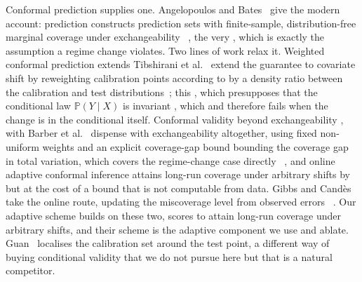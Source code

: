 \documentclass[preprint,3p,times]{elsarticle}
\providecommand{\DIFaddtex}[1]{{\protect\color{blue} \sf #1}} %
\providecommand{\DIFdeltex}[1]{{\protect\color{red} \scriptsize #1}} %
\providecommand{\DIFaddbegin}{} %
\providecommand{\DIFaddend}{} %
\providecommand{\DIFdelbegin}{} %
\providecommand{\DIFdelend}{} %
\providecommand{\DIFadd}[1]{\texorpdfstring{\DIFaddtex{#1}}{#1}} %
\providecommand{\DIFdel}[1]{\texorpdfstring{\DIFdeltex{#1}}{}} %
\begin{document}
\DIFadd{Conformal prediction supplies one. Angelopoulos and Bates~\cite{angelopoulos2023} give the modern account: }\DIFaddend prediction \DIFdelbegin \DIFdel{constructs prediction }\DIFdelend sets with finite-sample, distribution-free \DIFaddbegin \DIFadd{marginal }\DIFaddend coverage under exchangeability\DIFdelbegin \DIFdel{~\cite{angelopoulos2023}, the very }\DIFdelend \DIFaddbegin \DIFadd{, which is exactly the }\DIFaddend assumption a regime change violates. Two lines of work relax it. \DIFdelbegin \DIFdel{Weighted conformal prediction extends }\DIFdelend \DIFaddbegin \DIFadd{Tibshirani et al.~\cite{tibshirani2019} extend }\DIFaddend the guarantee to covariate shift by reweighting calibration points \DIFdelbegin \DIFdel{according to }\DIFdelend \DIFaddbegin \DIFadd{by }\DIFaddend a density ratio\DIFdelbegin \DIFdel{between the calibration and test distributions~\cite{tibshirani2019}; this }\DIFdelend \DIFaddbegin \DIFadd{, which }\DIFaddend presupposes that the conditional law $\mathbb{P}(Y\mid X)$ is invariant \DIFdelbegin \DIFdel{, which }\DIFdelend \DIFaddbegin \DIFadd{and therefore }\DIFaddend fails when the change is in the conditional itself. \DIFdelbegin \DIFdel{Conformal validity beyond exchangeability , with }\DIFdelend \DIFaddbegin \DIFadd{Barber et al.~\cite{barber2023} dispense with exchangeability altogether, using }\DIFaddend fixed non-uniform weights and \DIFdelbegin \DIFdel{an explicit coverage-gap bound }\DIFdelend \DIFaddbegin \DIFadd{bounding the coverage gap }\DIFaddend in total variation, \DIFaddbegin \DIFadd{which }\DIFaddend covers the regime-change case directly \DIFdelbegin \DIFdel{~\cite{barber2023}, and online adaptive conformal inference attains long-run coverage under arbitrary shifts by }\DIFdelend \DIFaddbegin \DIFadd{but at the cost of a bound that is not computable from data. Gibbs and Cand\`es~\cite{gibbs2021} take the online route, }\DIFaddend updating the miscoverage level from observed errors \DIFdelbegin \DIFdel{~\cite{gibbs2021}. Our adaptive scheme builds on these two, scores }\DIFdelend \DIFaddbegin \DIFadd{to attain long-run coverage under arbitrary shifts, and their scheme is the adaptive component we use and ablate. Guan~\cite{guan2022} localises the calibration set around the test point, a different way of buying conditional validity that we do not pursue here but that is a natural competitor.
}
\end{document}
